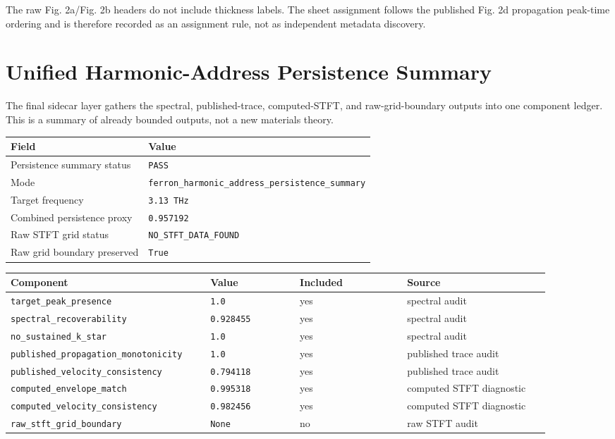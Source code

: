 \documentclass[11pt]{article}
\begin{document}
The raw Fig. 2a/Fig. 2b headers do not include thickness labels. The sheet
assignment follows the published Fig. 2d propagation peak-time ordering and is
therefore recorded as an assignment rule, not as independent metadata discovery.

\section{Unified Harmonic-Address Persistence Summary}

The final sidecar layer gathers the spectral, published-trace, computed-STFT,
and raw-grid-boundary outputs into one component ledger. This is a summary of
already bounded outputs, not a new materials theory.

\begin{center}
\begin{tabular}{ll}
\toprule
Field & Value \\
\midrule
Persistence summary status & \texttt{PASS} \\
Mode & \texttt{ferron\_harmonic\_address\_persistence\_summary} \\
Target frequency & \texttt{3.13 THz} \\
Combined persistence proxy & \texttt{0.957192} \\
Raw STFT grid status & \texttt{NO\_STFT\_DATA\_FOUND} \\
Raw grid boundary preserved & \texttt{True} \\
\bottomrule
\end{tabular}
\end{center}

\begin{longtable}{p{0.32\linewidth}p{0.15\linewidth}p{0.18\linewidth}p{0.24\linewidth}}
\toprule
Component & Value & Included & Source \\
\midrule
\endhead
\texttt{target\_peak\_presence} & \texttt{1.0} & yes & spectral audit \\
\texttt{spectral\_recoverability} & \texttt{0.928455} & yes & spectral audit \\
\texttt{no\_sustained\_k\_star} & \texttt{1.0} & yes & spectral audit \\
\texttt{published\_propagation\_monotonicity} & \texttt{1.0} & yes & published trace audit \\
\texttt{published\_velocity\_consistency} & \texttt{0.794118} & yes & published trace audit \\
\texttt{computed\_envelope\_match} & \texttt{0.995318} & yes & computed STFT diagnostic \\
\texttt{computed\_velocity\_consistency} & \texttt{0.982456} & yes & computed STFT diagnostic \\
\texttt{raw\_stft\_grid\_boundary} & \texttt{None} & no & raw STFT audit \\
\bottomrule
\end{longtable}
\end{document}
